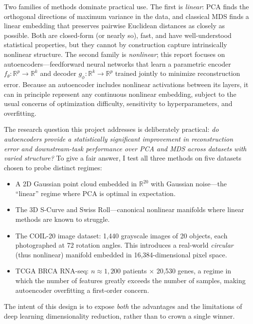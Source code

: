 \documentclass[11pt]{article}
\begin{document}
Two families of methods dominate practical use. The first is \emph{linear}: PCA finds the orthogonal directions of maximum variance in the data, and classical MDS finds a linear embedding that preserves pairwise Euclidean distances as closely as possible. Both are closed-form (or nearly so), fast, and have well-understood statistical properties, but they cannot by construction capture intrinsically nonlinear structure. The second family is \emph{nonlinear}; this report focuses on autoencoders---feedforward neural networks that learn a parametric encoder $f_\theta : \mathbb{R}^p \to \mathbb{R}^k$ and decoder $g_\phi : \mathbb{R}^k \to \mathbb{R}^p$ trained jointly to minimize reconstruction error. Because an autoencoder includes nonlinear activations between its layers, it can in principle represent any continuous nonlinear embedding, subject to the usual concerns of optimization difficulty, sensitivity to hyperparameters, and overfitting.

The research question this project addresses is deliberately practical: \emph{do autoencoders provide a statistically significant improvement in reconstruction error and downstream-task performance over PCA and MDS across datasets with varied structure?} To give a fair answer, I test all three methods on five datasets chosen to probe distinct regimes:

\begin{itemize}[noitemsep, topsep=2pt]
  \item A 2D Gaussian point cloud embedded in $\mathbb{R}^{20}$ with Gaussian noise---the ``linear'' regime where PCA is optimal in expectation.
  \item The 3D S-Curve and Swiss Roll---canonical nonlinear manifolds where linear methods are known to struggle.
  \item The COIL-20 image dataset: 1{,}440 grayscale images of 20 objects, each photographed at 72 rotation angles. This introduces a real-world \emph{circular} (thus nonlinear) manifold embedded in 16{,}384-dimensional pixel space.
  \item TCGA BRCA RNA-seq: $n \approx 1{,}200$ patients $\times$ 20{,}530 genes, a regime in which the number of features greatly exceeds the number of samples, making autoencoder overfitting a first-order concern.
\end{itemize}

The intent of this design is to expose \emph{both} the advantages and the limitations of deep learning dimensionality reduction, rather than to crown a single winner.
\end{document}
